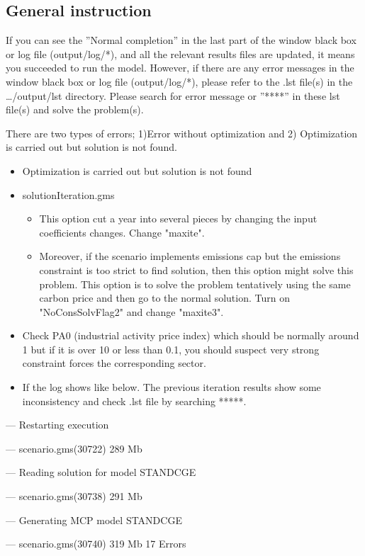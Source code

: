 \documentclass[10pt,a4paper,titlepage,dvipdfmx]{book}
\begin{document}
\subsection{\label{subsec:GenIns}General instruction}

If you can see the ''Normal completion'' in the last part of the window black box or log file (output/log/*), and all the relevant results files are updated, it means you succeeded to run the model. However, if there are any error messages in the window black box or log file (output/log/*), please refer to the .lst file(s) in the {\ldots}/output/lst directory. Please search for error message or ''****'' in these lst file(s) and solve the problem(s).

There are two types of errors; 1)Error without optimization and 2) Optimization is carried out but solution is not found.
\begin{itemize}
\item Optimization is carried out but solution is not found
\item solutionIteration.gms
\begin{itemize}
\item This option cut a year into several pieces by changing the input coefficients changes. Change "maxite".
\item Moreover, if the scenario implements emissions cap but the emissions constraint is too strict to find solution, then this option might solve this problem. This option is to solve the problem tentatively using the same carbon price and then go to the normal solution. Turn on "NoConsSolvFlag2" and change "maxite3".
\end{itemize}

\item Check PA0 (industrial activity price index) which should be normally around 1 but if it is over 10 or less than 0.1, you should suspect very strong constraint forces the corresponding sector.
\item If the log shows like below. The previous iteration results show some inconsistency and check .lst file by searching *****.
\end{itemize}
--- Restarting execution

--- scenario.gms(30722) 289 Mb

--- Reading solution for model STANDCGE

--- scenario.gms(30738) 291 Mb

--- Generating MCP model STANDCGE

--- scenario.gms(30740) 319 Mb 17 Errors
\end{document}
